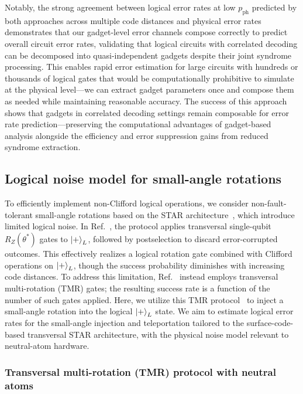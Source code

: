\documentclass[aps, prx, reprint, superscriptaddress, longbibliography, floatfix]{revtex4-2}
\begin{document}
Notably, the strong agreement between logical error rates at low $p_{\mathrm{ph}}$ predicted by both approaches across multiple code distances and physical error rates demonstrates that our gadget-level error channels compose correctly to predict overall circuit error rates, validating that logical circuits with correlated decoding can be decomposed into quasi-independent gadgets despite their joint syndrome processing. This enables rapid error estimation for large circuits with hundreds or thousands of logical gates that would be computationally prohibitive to simulate at the physical level—we can extract gadget parameters once and compose them as needed while maintaining reasonable accuracy. The success of this approach shows that gadgets in correlated decoding settings remain composable for error rate prediction—preserving the computational advantages of gadget-based analysis alongside the efficiency and error suppression gains from reduced syndrome extraction.




\subsection{Logical noise model for small-angle rotations}
\label{sec:sm_inj_noise}

To efficiently implement non-Clifford logical operations, we consider non-fault-tolerant small-angle rotations based on the STAR architecture~\cite{Choi2023, Toshio2024}, which introduce limited logical noise. In Ref.~\cite{Choi2023}, the protocol applies transversal single-qubit $R_Z(\theta^*)$ gates to $\ket{+}_L$, followed by postselection to discard error-corrupted outcomes. This effectively realizes a logical rotation gate combined with Clifford operations on $\ket{+}_L$, though the success probability diminishes with increasing code distances. To address this limitation, Ref.~\cite{Toshio2024} instead employs transversal multi-rotation (TMR) gates; the resulting success rate is a function of the number of such gates applied. Here, we utilize this TMR  protocol~\cite{Toshio2024, Choi2023} to inject a small-angle rotation into the logical $\ket{+}_L$ state. We aim to estimate logical error rates for the small-angle injection and teleportation tailored to the surface-code-based transversal STAR architecture, with the physical noise model relevant to neutral-atom hardware.


\subsubsection{Transversal multi-rotation (TMR) protocol with neutral atoms}
\label{sec:magicnoise}
\end{document}
